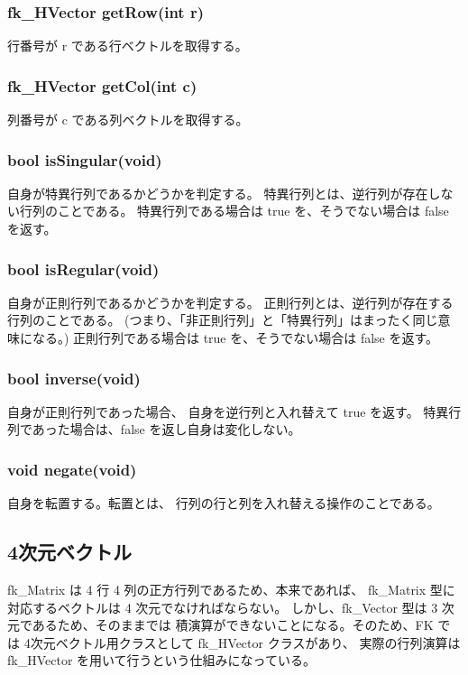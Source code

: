 \subsubsection*{fk\_HVector getRow(int r)}
行番号が r である行ベクトルを取得する。

\subsubsection*{fk\_HVector getCol(int c)}
列番号が c である列ベクトルを取得する。

\subsubsection*{bool isSingular(void)}
自身が特異行列であるかどうかを判定する。
特異行列とは、逆行列が存在しない行列のことである。
特異行列である場合は true を、そうでない場合は false を返す。

\subsubsection*{bool isRegular(void)}
自身が正則行列であるかどうかを判定する。
正則行列とは、逆行列が存在する行列のことである。
(つまり、「非正則行列」と「特異行列」はまったく同じ意味になる。)
正則行列である場合は true を、そうでない場合は false を返す。

\subsubsection*{bool inverse(void)}
自身が正則行列であった場合、
自身を逆行列と入れ替えて true を返す。
特異行列であった場合は、false を返し自身は変化しない。

\subsubsection*{void negate(void)}
自身を転置する。転置とは、
行列の行と列を入れ替える操作のことである。

\subsection{4次元ベクトル}
fk\_Matrix は 4 行 4 列の正方行列であるため、本来であれば、
fk\_Matrix 型に対応するベクトルは 4 次元でなければならない。
しかし、fk\_Vector 型は 3 次元であるため、そのままでは
積演算ができないことになる。そのため、FK では
4次元ベクトル用クラスとして fk\_HVector クラスがあり、
実際の行列演算は fk\_HVector を用いて行うという仕組みになっている。

